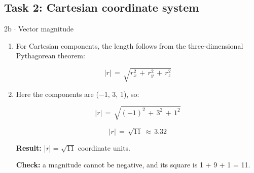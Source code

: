 \documentclass[11pt]{article}
\begin{document}
\begin{keepsection}\subsection{Task 2: Cartesian coordinate system}

\begin{workedbox}{2b \ensuremath{\cdot} Vector magnitude}
\begin{enumerate}
\item {}
For Cartesian components, the length follows from the three-dimensional Pythagorean theorem:

\begin{equation*}|{r}|\, =\, \sqrt{{r}_{{x}}^{2}\, +\, {r}_{{y}}^{2}\, +\, {r}_{{z}}^{2}}\end{equation*}
\item {}
Here the components are (\ensuremath{-}1, 3, 1), so:

\begin{equation*}|{r}|\, =\, \sqrt{(-1)^{2}\, +\, 3^{2}\, +\, 1^{2}}\end{equation*}

\begin{equation*}|{r}|\, =\, \sqrt{11}\, \approx \, 3.32\end{equation*}

\textbf{Result:} |\textit{r}| = \ensuremath{\sqrt{11}} coordinate units.

\textbf{Check:} a magnitude cannot be negative, and its square is 1 + 9 + 1 = 11.
\end{enumerate}
\end{workedbox}

\end{keepsection}
\end{document}
